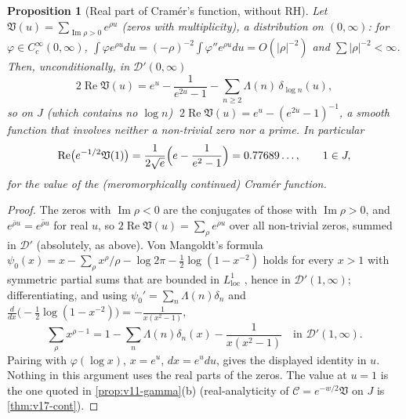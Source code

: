 \documentclass[11pt,a4paper]{article}
\numberwithin{equation}{section}
\newtheorem{proposition}[theorem]{Proposition}
\theoremstyle{definition}
\theoremstyle{remark}
\begin{document}
\begin{proposition}[Real part of Cram\'er's function, without RH]\label{prop:v13-real}
Let $\mathfrak V(u)=\sum_{\operatorname{Im}\rho>0}e^{\rho u}$ (zeros with multiplicity), a distribution on $(0,\infty)$: for $\varphi\in C_c^\infty(0,\infty)$, $\int\varphi e^{\rho u}du=(-\rho)^{-2}\int\varphi''e^{\rho u}du=O(|\rho|^{-2})$ and $\sum|\rho|^{-2}<\infty$. Then, unconditionally, in $\mathcal D'(0,\infty)$
\begin{equation}
2\operatorname{Re}\mathfrak V(u)=e^{u}-\frac1{e^{2u}-1}-\sum_{n\ge2}\Lambda(n)\,\delta_{\log n}(u),
\end{equation}
so on $J$ (which contains no $\log n$) $\;2\operatorname{Re}\mathfrak V(u)=e^u-(e^{2u}-1)^{-1}$, a smooth function that involves neither a non-trivial zero nor a prime. In particular
\begin{equation}
\operatorname{Re}\bigl(e^{-1/2}\mathfrak V(1)\bigr)=\frac1{2\sqrt e}\Bigl(e-\frac1{e^2-1}\Bigr)=0.77689\ldots,\qquad 1\in J,
\end{equation}
for the value of the (meromorphically continued) Cram\'er function.
\end{proposition}
\begin{proof}
The zeros with $\operatorname{Im}\rho<0$ are the conjugates of those with $\operatorname{Im}\rho>0$, and $e^{\bar\rho u}=\overline{e^{\rho u}}$ for real $u$, so $2\operatorname{Re}\mathfrak V(u)=\sum_\rho e^{\rho u}$ over all non-trivial zeros, summed in $\mathcal D'$ (absolutely, as above). Von Mangoldt's formula $\psi_0(x)=x-\sum_\rho x^\rho/\rho-\log2\pi-\frac12\log(1-x^{-2})$ holds for every $x>1$ with symmetric partial sums that are bounded in $L^1_{\mathrm{loc}}$ \cite[Ch.~17]{Davenport2000}, hence in $\mathcal D'(1,\infty)$; differentiating, and using $\psi_0'=\sum_n\Lambda(n)\delta_n$ and $\frac{d}{dx}\bigl(-\frac12\log(1-x^{-2})\bigr)=-\frac1{x(x^2-1)}$,
\begin{equation}
\sum_\rho x^{\rho-1}=1-\sum_n\Lambda(n)\delta_n(x)-\frac1{x(x^2-1)}\quad\text{in }\mathcal D'(1,\infty).
\end{equation}
Pairing with $\varphi(\log x)$, $x=e^u$, $dx=e^udu$, gives the displayed identity in $u$. Nothing in this argument uses the real parts of the zeros. The value at $u=1$ is the one quoted in \cref{prop:v11-gamma}(b) (real-analyticity of $\mathscr C=e^{-w/2}\mathfrak V$ on $J$ is \cref{thm:v17-cont}).
\end{proof}
\end{document}
